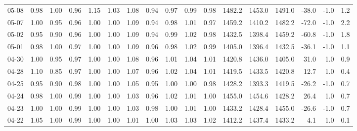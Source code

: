 \begin{threeparttable}
{\begin{tabular}{lrrrrrrrrrrrrrrrr}
  05-08 &   0.98 &   1.00 &         0.96 &     1.15 &           1.03 &        1.08 &        0.94 &        0.97 &          0.99 &          0.98 & 1482.2 & 1453.0 & 1491.0 &      -38.0 &                     -1.0 &                 1.2 \\
  05-07 &   1.00 &   0.95 &         0.96 &     1.00 &           1.00 &        1.09 &        0.94 &        0.98 &          1.01 &          0.97 & 1459.2 & 1410.2 & 1482.2 &      -72.0 &                     -1.0 &                 2.2 \\
  05-02 &   0.95 &   0.90 &         0.96 &     1.00 &           1.00 &        1.09 &        0.94 &        0.99 &          1.02 &          0.98 & 1432.5 & 1398.4 & 1459.2 &      -60.8 &                     -1.0 &                 1.8 \\
  05-01 &   0.98 &   1.00 &         0.97 &     1.00 &           1.00 &        1.09 &        0.96 &        0.98 &          1.02 &          0.99 & 1405.0 & 1396.4 & 1432.5 &      -36.1 &                     -1.0 &                 1.1 \\
  04-30 &   1.00 &   0.95 &         0.97 &     1.00 &           1.00 &        1.08 &        0.96 &        1.01 &          1.04 &          1.01 & 1420.8 & 1436.0 & 1405.0 &       31.0 &                      1.0 &                 0.9 \\
  04-28 &   1.10 &   0.85 &         0.97 &     1.00 &           1.00 &        1.07 &        0.96 &        1.02 &          1.04 &          1.01 & 1419.5 & 1433.5 & 1420.8 &       12.7 &                      1.0 &                 0.4 \\
  04-25 &   0.95 &   0.90 &         0.98 &     1.00 &           1.00 &        1.05 &        0.95 &        1.00 &          1.00 &          0.98 & 1428.2 & 1393.3 & 1419.5 &      -26.2 &                     -1.0 &                 0.7 \\
  04-24 &   0.98 &   1.00 &         0.99 &     1.00 &           1.00 &        1.03 &        0.96 &        1.02 &          1.01 &          1.00 & 1455.0 & 1454.6 & 1428.2 &       26.4 &                      1.0 &                 0.7 \\
  04-23 &   1.00 &   1.00 &         0.99 &     1.00 &           1.00 &        1.03 &        0.98 &        1.00 &          1.01 &          1.00 & 1433.2 & 1428.4 & 1455.0 &      -26.6 &                     -1.0 &                 0.7 \\
  04-22 &   1.05 &   1.00 &         0.99 &     1.00 &           1.00 &        1.01 &        1.00 &        1.03 &          1.03 &          1.02 & 1412.2 & 1437.4 & 1433.2 &        4.1 &                      1.0 &                 0.1 \\

\end{tabular}}
\end{threeparttable}
